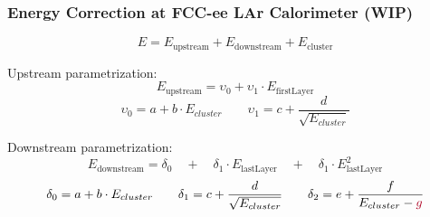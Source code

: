\documentclass{beamer}
\newcommand{\redtext}[1]{%
  \textcolor{myRed}{#1}
}
\begin{document}
\begin{frame}
  \frametitle{Energy Correction at FCC-ee LAr Calorimeter (WIP)}

  \begin{equation*}
    E = E_\text{upstream} + E_\text{downstream} + E_\text{cluster}
  \end{equation*}

  \redtext{Upstream} parametrization:
  \begin{equation*}
  E_\text{upstream} = \upsilon_0 +
                      \upsilon_1 \cdot E_\text{firstLayer}
  \end{equation*}
  \begin{equation*}
    \upsilon_0 = a + b \cdot E_{cluster}  \qquad
    \upsilon_1 = c + \frac{d}{\sqrt{E_{cluster}}}
  \end{equation*}

  \redtext{Downstream} parametrization:
  \begin{equation*}
  E_\text{downstream} = \delta_0 \quad + \quad
                        \delta_1 \cdot E_\text{lastLayer} \quad + \quad
                        \delta_1 \cdot E_\text{lastLayer}^{2}
  \end{equation*}
  \begin{equation*}
    \delta_0 = a + b \cdot E_{cluster}  \qquad
    \delta_1 = c + \frac{d}{\sqrt{E_{cluster}}} \qquad
    \delta_2 = e + \frac{f}{E_{cluster} - \redtext{g}}
  \end{equation*}
\end{frame}
\end{document}
